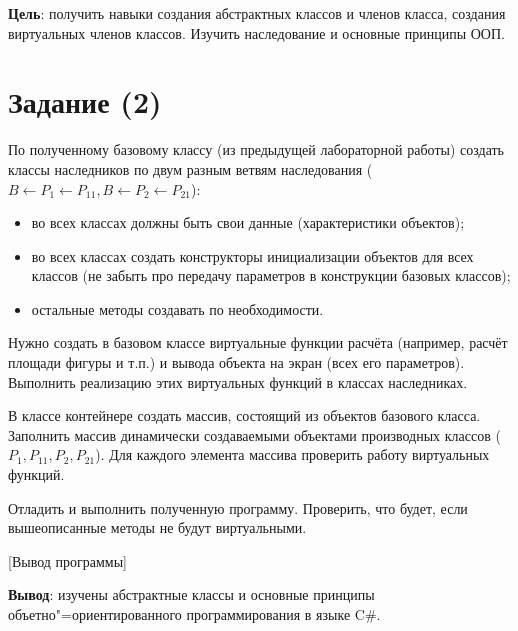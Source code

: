 \documentclass{bsuir}
\newcommand{\csharp}{C{\liberationrm\#}}
\begin{document}
\maketitle
\mainmatter
\renewcommand{\thefigure}{\arabic{figure}}
\renewcommand{\thelisting}{\arabic{listing}}

\textbf{Цель}: получить навыки создания абстрактных классов и членов класса,
создания виртуальных членов классов. Изучить наследование и основные принципы
ООП.

\section*{Задание (2)}

По полученному базовому классу (из предыдущей лабораторной работы) создать
классы наследников по двум разным ветвям наследования ($B\leftarrow
P_1\leftarrow P_{11}, B\leftarrow P_2\leftarrow P_{21}$):

\begin{itemize}
    \item во всех классах должны быть свои данные (характеристики объектов);
    \item во всех классах создать конструкторы инициализации объектов для
          всех классов (не забыть про передачу параметров в конструкции
          базовых классов);
    \item остальные методы создавать по необходимости.
\end{itemize}

Нужно создать в базовом классе виртуальные функции расчёта (например, расчёт
площади фигуры и т.п.) и вывода объекта на экран (всех его параметров).
Выполнить реализацию этих виртуальных функций в классах наследниках.

В классе контейнере создать массив, состоящий из объектов базового класса.
Заполнить массив динамически создаваемыми объектами производных классов ($P_1,
P_{11}, P_2, P_{21}$). Для каждого элемента массива проверить работу виртуальных
функций.

Отладить и выполнить полученную программу. Проверить, что будет, если
вышеописанные методы не будут виртуальными.


[Вывод программы]

\textbf{Вывод}: изучены абстрактные классы и основные принципы
объетно"=ориентированного программирования в языке \csharp.
\end{document}
